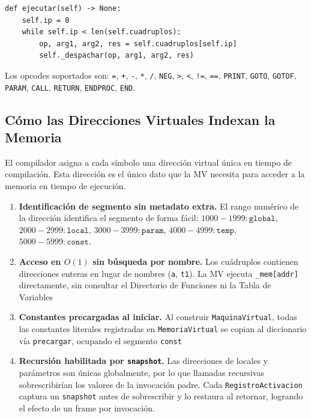 \documentclass[12pt, letterpaper]{article}
\theoremstyle{definition}
\begin{document}
\begin{verbatim}
def ejecutar(self) -> None:
    self.ip = 0
    while self.ip < len(self.cuadruplos):
        op, arg1, arg2, res = self.cuadruplos[self.ip]
        self._despachar(op, arg1, arg2, res)
\end{verbatim}

Los opcodes soportados son: \texttt{=}, \texttt{+}, \texttt{-}, \texttt{*}, \texttt{/}, \texttt{NEG}, \texttt{>}, \texttt{<}, \texttt{!=}, \texttt{==}, \texttt{PRINT}, \texttt{GOTO}, \texttt{GOTOF}, \texttt{PARAM}, \texttt{CALL}, \texttt{RETURN}, \texttt{ENDPROC}, \texttt{END}.

\subsection{Cómo las Direcciones Virtuales Indexan la Memoria}

El compilador asigna a cada símbolo una dirección virtual única en tiempo de compilación. Esta dirección es el único dato que la MV necesita para acceder a la memoria en tiempo de ejecución.

\begin{enumerate}
    \item \textbf{Identificación de segmento sin metadato extra.}
    El rango numérico de la dirección identifica el segmento de forma fácil:
    $1000{-}1999 : \texttt{global}$,
    $2000{-}2999 : \texttt{local}$,
    $3000{-}3999 : \texttt{param}$,
    $4000{-}4999 : \texttt{temp}$,
    $5000{-}5999 : \texttt{const}$.

    \item \textbf{Acceso en $O(1)$ sin búsqueda por nombre.}
    Los cuádruplos contienen direcciones enteras  en lugar de nombres (\texttt{a}, \texttt{t1}). La MV ejecuta \texttt{\_mem[addr]} directamente, sin consultar el Directorio de Funciones ni la Tabla de Variables

    \item \textbf{Constantes precargadas al iniciar.}
    Al construir \texttt{MaquinaVirtual}, todas las constantes literales registradas en \texttt{MemoriaVirtual} se copian al diccionario vía \texttt{precargar}, ocupando el segmento \texttt{const}

    \item \textbf{Recursión habilitada por \texttt{snapshot}.}
    Las direcciones de locales y parámetros son únicas globalmente, por lo que llamadas recursivas sobrescribirían los valores de la invocación padre. Cada \texttt{RegistroActivacion} captura un \texttt{snapshot} antes de sobrescribir y lo restaura al retornar, logrando el efecto de un frame por invocación.
\end{enumerate}
\end{document}
